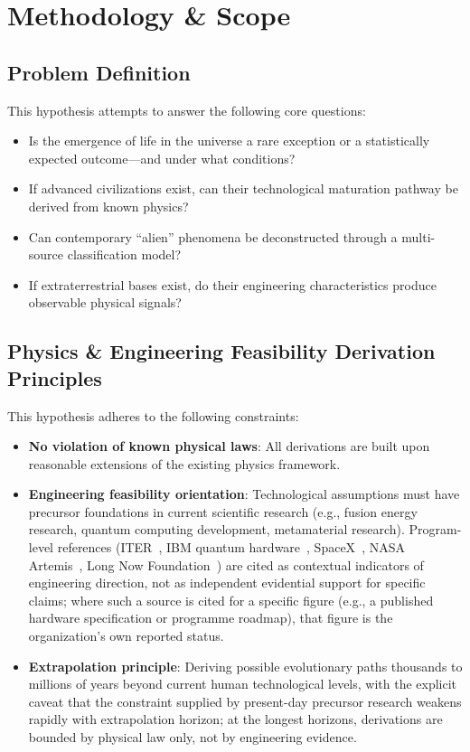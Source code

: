 \documentclass[aps,prd,twocolumn,superscriptaddress,nofootinbib]{revtex4-2}
\begin{document}
\section{Methodology \& Scope}\label{sec:methodology}

\subsection{Problem Definition}\label{sec:problem-definition}

This hypothesis attempts to answer the following core questions:

\begin{itemize}
  \item Is the emergence of life in the universe a rare exception or a statistically expected outcome---and under what conditions?
  \item If advanced civilizations exist, can their technological maturation pathway be derived from known physics?
  \item Can contemporary ``alien'' phenomena be deconstructed through a multi-source classification model?
  \item If extraterrestrial bases exist, do their engineering characteristics produce observable physical signals?
\end{itemize}

\subsection{Physics \& Engineering Feasibility Derivation Principles}\label{sec:derivation-principles}

This hypothesis adheres to the following constraints:

\begin{itemize}
  \item \textbf{No violation of known physical laws}: All derivations are built upon reasonable extensions of the existing physics framework.
  \item \textbf{Engineering feasibility orientation}: Technological assumptions must have precursor foundations in current scientific research (e.g., fusion energy research, quantum computing development, metamaterial research). Program-level references (ITER~\cite{ITER}, IBM quantum hardware~\cite{IBM_Quantum}, SpaceX~\cite{SpaceX_Mars}, NASA Artemis~\cite{NASA_Artemis}, Long Now Foundation~\cite{LongNow_Clock}) are cited as contextual indicators of engineering direction, not as independent evidential support for specific claims; where such a source is cited for a specific figure (e.g., a published hardware specification or programme roadmap), that figure is the organization's own reported status.
  \item \textbf{Extrapolation principle}: Deriving possible evolutionary paths thousands to millions of years beyond current human technological levels, with the explicit caveat that the constraint supplied by present-day precursor research weakens rapidly with extrapolation horizon; at the longest horizons, derivations are bounded by physical law only, not by engineering evidence.
\end{itemize}
\end{document}
